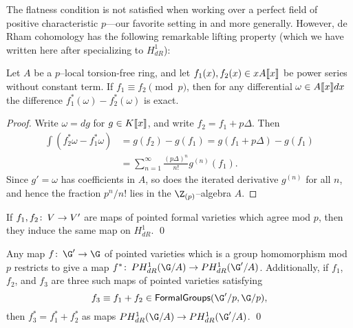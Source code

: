 

The flatness condition is not satisfied when working over a perfect field of positive characteristic $p$---our favorite setting in  and  more generally.  However, de Rham cohomology has the following remarkable lifting property (which we have written here after specializing to $H^1_{dR}$):

\begin{theorem}{\cite[Key Lemma 5.1.3]{Katz}}
Let $A$ be a $p$--local torsion-free ring, and let $f_1(x), f_2(x) \in x A\llbracket{x}\rrbracket$ be power series without constant term.  If $f_1 \equiv f_2 \pmod{p}$, then for any differential $\omega \in A\llbracket{x}\rrbracket dx$ the difference $f_1^*(\omega) - f_2^*(\omega)$ is exact.
\end{theorem}
\begin{proof}
Write $\omega = dg$ for $g \in K\llbracket{x}\rrbracket$, and write $f_2 = f_1 + p\Delta$.  Then
\begin{align*}
\int \left( f_2^* \omega - f_1^* \omega \right) & = g(f_2) - g(f_1) = g(f_1 + p\Delta) - g(f_1) \\
& = \sum_{n = 1}^\infty \frac{(p\Delta)^n}{n!} g^{(n)}(f_1).
\end{align*}
Since $g' = \omega$ has coefficients in $A$, so does the iterated derivative $g^{(n)}$ for all $n$, and hence the fraction $p^n/n!$ lies in the $\Z_{(p)}$--algebra $A$.
\end{proof}

\begin{corollary}[{$H^1_{dR}$ is ``crystalline''}]\label{H1dRIsCrystalline}
If $f_1, f_2\colon\thinspace V \to V'$ are maps of pointed formal varieties which agree mod $p$, then they induce the same map on $H^1_{dR}$. \qed
\end{corollary}

\begin{corollary}
Any map $f\co \G' \to \G$ of pointed varieties which is a group homomorphism mod $p$ restricts to give a map $f^*\co PH^1_{dR}(\G/A) \to PH^1_{dR}(\G'/A)$.  Additionally, if $f_1$, $f_2$, and $f_3$ are three such maps of pointed varieties satisfying \[f_3 \equiv f_1 + f_2 \in \CatOf{FormalGroups}(\G'/p, \G/p),\] then $f_3^* = f_1^* + f_2^*$ as maps $PH^1_{dR}(\G/A) \to PH^1_{dR}(\G'/A)$. \qed
\end{corollary}


